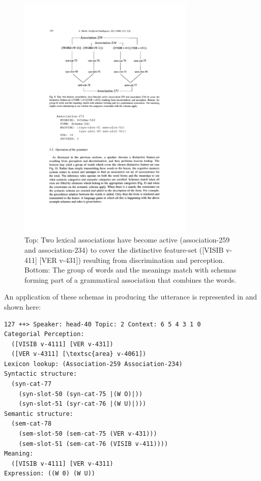 \begin{figure}[t]
\centerline{
\includegraphics[width=0.75\textwidth]{chap10/figs/associations.pdf}}
\caption{\label{fig:associations}Top: Two lexical associations have become active (association-259 and association-234) to cover the distinctive 
feature-set ([VISIB v-411] [VER v-431]) resulting from discrimination and perception. Bottom: 
The group of words and the meanings match with schemas forming part of a grammatical association that combines the words. }
\end{figure}
An application of these schemas in producing the utterance  is represented in  and shown 
here: 
\begin{verbatim}
127 ++> Speaker: head-40 Topic: 2 Context: 6 5 4 3 1 0
Categorial Perception:
  ([VISIB v-4111] [VER v-431])
  ([VER v-4311] [\textsc{area} v-4061])
Lexicon lookup: (Association-259 Association-234)
Syntactic structure:
  (syn-cat-77
    (syn-slot-50 (syn-cat-75 |(W O)|))
    (syn-slot-51 (syr-cat-76 |(W U)|)))
Semantic structure:
  (sem-cat-78
    (sem-slot-50 (sem-cat-75 (VER v-431)))
    (sem-slot-51 (sem-cat-76 (VISIB v-411))))
Meaning:
  ([VISIB v-4111] [VER v-4311)
Expression: ((W 0) (W U))
\end{verbatim}

